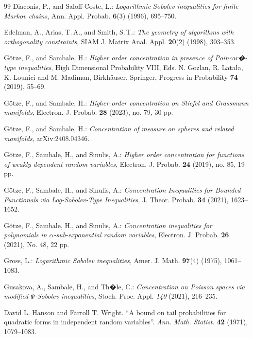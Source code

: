 \documentclass[a4paper,12pt]{amsart}
\numberwithin{equation}{section}
\theoremstyle{remark}
\begin{document}
\begin{thebibliography}{99}
	 Diaconis, P., and Saloff-Coste, L.: \emph{Logarithmic Sobolev inequalities for finite Markov chains}, Ann. Appl. Probab. \textbf{6}(3) (1996), 695--750.
	
	 Edelman, A., Arias, T.\,A., and Smith, S.\,T.: \emph{The geometry of algorithms with orthogonality constraints}, SIAM J. Matrix Anal. Appl. \textbf{20}(2) (1998), 303--353.
	
	 G\"{o}tze, F., and Sambale, H.: \emph{Higher order concentration in presence of Poincar�-type inequalities}, High Dimensional Probability VIII, Eds. N. Gozlan, R. Lata{\l}a, K. Lounici and M. Madiman, Birkh\"{a}user, Springer, Progress in Probability \textbf{74} (2019), 55--69.
	
	 G\"{o}tze, F., and Sambale, H.: \emph{Higher order concentration on Stiefel and Grassmann manifolds}, Electron. J. Probab. \textbf{28} (2023), no. 79, 30 pp.
	
	 G\"{o}tze, F., and Sambale, H.: \emph{Concentration of measure on spheres and related manifolds}, arXiv:2408.04346.
	
	 G\"{o}tze, F., Sambale, H., and Sinulis, A.: \emph{Higher order concentration for functions of weakly dependent random variables}, Electron. J. Probab. \textbf{24} (2019), no. 85, 19 pp.
	
	 G\"{o}tze, F., Sambale, H., and Sinulis, A.: \emph{Concentration Inequalities for Bounded Functionals via Log-Sobolev-Type Inequalities}, J. Theor. Probab. \textbf{34} (2021), 1623--1652.
	
	 G\"{o}tze, F., Sambale, H., and Sinulis, A.: \emph{Concentration inequalities for polynomials in $\alpha$-sub-exponential random variables}, Electron. J. Probab. \textbf{26} (2021), No. 48, 22 pp.
		
	 Gross, L.: \emph{Logarithmic Sobolev inequalities}, Amer. J. Math. \textbf{97}(4) (1975), 1061--1083.
	
	 Gusakova, A., Sambale, H., and Th�le, C.: \emph{Concentration on Poisson spaces via modified $\Psi$-Sobolev inequalities}, Stoch. Proc. Appl. \emph{140} (2021), 216--235.
	
	 David L. Hanson and Farroll T. Wright. ``A bound on tail probabilities for quadratic forms in independent random variables''. {\em Ann. Math. Statist.} \textbf{42} (1971), 1079--1083.
	

\end{thebibliography}
\end{document}
